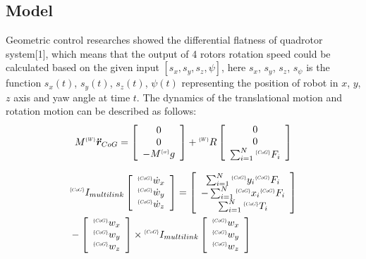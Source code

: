 \documentclass{jarticle}
\begin{document}
\subsection{Model}
Geometric control researches showed the differential flatness of quadrotor  system[1], which means that the output of 4 rotors rotation speed could be calculated based on the given input $[s_x, s_y, s_z, ψ]$, here $s_x$, $s_y$, $s_z$, $s_ψ$ is the function $s_x(t)$, $s_y(t)$, $s_z(t)$, $ψ(t)$  representing the position of robot in $x$, $y$, $z$ axis and yaw angle at time $t$.
The dynamics of the translational motion and rotation motion can be described as follows:
\begin{equation}
  \label{eq:model1}
  M^{\scalebox{.5}{$\{W\}$}}\bm{\ddot{r}}_{CoG} =\left[ \begin{array}{c}
      0 \\
      0 \\
      -M^{\scalebox{.5}{$\{w\}$}}g
    \end{array}\right]
  + {}^{\scalebox{.5}{$\{W\}$}}R \left[ \begin{array}{c}
        0 \\
        0 \\
        \sum_{i=1}^{N} {}^{\scalebox{.5}{$\{CoG\}$}}F_i
      \end{array}\right]
\end{equation}

\begin{eqnarray}
  \label{eq:model2-0}
  & {}^{\scalebox{.5}{$\{CoG\}$}}I_{multilink} \left[ \begin{array}{c}
      {}^{\scalebox{.5}{$\{CoG\}$}}\dot{w} _x \\
      {}^{\scalebox{.5}{$\{CoG\}$}}\dot{w} _y \\
      {}^{\scalebox{.5}{$\{CoG\}$}}\dot{w} _z
    \end{array}\right]
  = \left[ \begin{array}{c}
      \sum_{i=1}^{N} {}^{\scalebox{.5}{$\{CoG\}$}}y_i {}^{\scalebox{.5}{$\{CoG\}$}}F_i \\
      -\sum_{i=1}^{N} {}^{\scalebox{.5}{$\{CoG\}$}}x_i {}^{\scalebox{.5}{$\{CoG\}$}}F_i \\
      \sum_{i=1}^{N} {}^{\scalebox{.5}{$\{CoG\}$}}T_i
    \end{array}\right] \nonumber \\
  \label{eq:model2}
  & - \left[ \begin{array}{c}
      {}^{\scalebox{.5}{$\{CoG\}$}}w_x \\
      {}^{\scalebox{.5}{$\{CoG\}$}}w_y \\
      {}^{\scalebox{.5}{$\{CoG\}$}}w_z
    \end{array}\right]
  \times {}^{\scalebox{.5}{$\{CoG\}$}}I_{multilink} \left[ \begin{array}{c}
      {}^{\scalebox{.5}{$\{CoG\}$}}w_x \\
      {}^{\scalebox{.5}{$\{CoG\}$}}w_y \\
      {}^{\scalebox{.5}{$\{CoG\}$}}w_z
    \end{array}\right]
\end{eqnarray}
\end{document}

